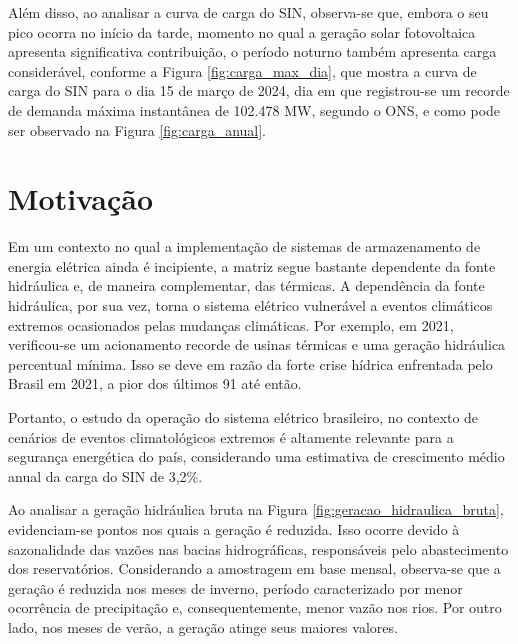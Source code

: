 Além disso, ao analisar a curva de carga do SIN, observa-se que, embora o seu pico ocorra no início da 
tarde, momento no qual a geração solar fotovoltaica apresenta significativa contribuição, o período noturno também 
apresenta carga considerável, conforme a Figura \ref{fig:carga_max_dia}, que mostra a curva de carga do SIN para o 
dia 15 de março de 2024, dia em que registrou-se um recorde de demanda máxima instantânea de 102.478 MW, segundo o ONS, 
e como pode ser observado na Figura \ref{fig:carga_anual}.

\begin{figure}[!ht]
	{}
	{}
\end{figure}

\section{Motivação}
Em um contexto no qual a implementação de sistemas de armazenamento de energia elétrica ainda é incipiente,
a matriz segue bastante dependente da fonte hidráulica e, de maneira complementar, das térmicas. A dependência da fonte
hidráulica, por sua vez, torna o sistema elétrico vulnerável a eventos climáticos extremos ocasionados pelas mudanças
climáticas. Por exemplo, em 2021, verificou-se um acionamento recorde de usinas térmicas e uma geração hidráulica 
percentual mínima. Isso se deve em razão da forte crise hídrica enfrentada pelo Brasil em 2021, a pior dos últimos 91 
até então. \cite{Soares2023}

\begin{figure}[!ht]
	{}
	{}
\end{figure}

Portanto, o estudo da operação do sistema elétrico brasileiro, no contexto de cenários de eventos
climatológicos extremos é altamente relevante para a segurança energética do país, considerando uma estimativa de 
crescimento médio anual da carga do SIN de 3,2\%. \cite{pen2024}

Ao analisar a geração hidráulica bruta na Figura \ref{fig:geracao_hidraulica_bruta}, evidenciam-se pontos nos 
quais a geração é reduzida. Isso ocorre devido à sazonalidade das vazões nas bacias hidrográficas, responsáveis pelo 
abastecimento dos reservatórios. Considerando a amostragem em base mensal, observa-se que a geração é reduzida nos meses
de inverno, período caracterizado por menor ocorrência de precipitação e, consequentemente, menor vazão nos rios. Por
outro lado, nos meses de verão, a geração atinge seus maiores valores.

